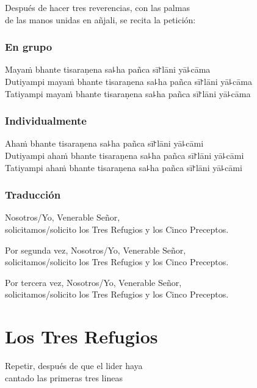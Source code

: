 \begin{instruction}
  Después de hacer tres reverencias, con las palmas\\
  de las manos unidas en añjali, se recita la petición:
\end{instruction}

\subsection{En grupo}

Mayaṁ bhante tisaraṇena sa꜕ha pañca sī꜓lāni yā꜕cāma\\
Dutiyampi mayaṁ bhante tisaraṇena sa꜕ha pañca sī꜓lāni yā꜕cāma\\
Tatiyampi mayaṁ bhante tisaraṇena sa꜕ha pañca sī꜓lāni yā꜕cāma

\subsection{Individualmente}

Ahaṁ bhante tisaraṇena sa꜕ha pañca sī꜓lāni yā꜕cāmi\\
Dutiyampi ahaṁ bhante tisaraṇena sa꜕ha pañca sī꜓lāni yā꜕cāmi\\
Tatiyampi ahaṁ bhante tisaraṇena sa꜕ha pañca sī꜓lāni yā꜕cāmi

\subsection{Traducción}

\begin{english}
  Nosotros/Yo, Venerable Señor,\\
  \vin solicitamos/solicito los Tres Refugios y los Cinco Preceptos.
  
  Por segunda vez, Nosotros/Yo, Venerable Señor,\\
  \vin solicitamos/solicito los Tres Refugios y los Cinco Preceptos.
  
  Por tercera vez, Nosotros/Yo, Venerable Señor,\\
  \vin solicitamos/solicito los Tres Refugios y los Cinco Preceptos.
\end{english}

\clearpage
\chapter{Los Tres Refugios}

\begin{instruction}
  Repetir, después de que el lider haya\\
  cantado las primeras tres lineas
\end{instruction}

